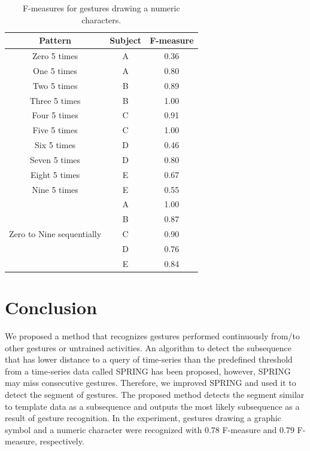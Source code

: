 \documentclass{sigchi-ext}
\begin{document}
        \begin{table}[!t]
        \centering
            \caption{F-measures for gestures drawing a numeric characters.}
            \label{tab:num-result}
                \begin{tabular}{c|cc}\hline\hline
                    Pattern & Subject & F-measure \\ \hline
                    Zero 5 times& A & 0.36  \\
                    One 5 times& A & 0.80  \\
                    Two 5 times& B & 0.89  \\
                    Three 5 times & B & 1.00  \\
                    Four 5 times& C & 0.91  \\
                    Five 5 times & C & 1.00  \\
                    Six 5 times& D & 0.46  \\
                    Seven 5 times & D & 0.80  \\
                    Eight 5 times& E & 0.67  \\
                    Nine 5 times& E & 0.55  \\ \hline
                    & A & 1.00  \\
                    & B & 0.87  \\
                    Zero to Nine sequentially & C  & 0.90  \\
                    & D & 0.76  \\
                    & E & 0.84  \\\hline
                \end{tabular}
        \end{table}

        \section{Conclusion}
        We proposed a method that recognizes gestures performed continuously from/to other gestures or untrained activities. An algorithm to detect the subsequence that has lower distance to a query of time-series than the predefined threshold from a time-series data called SPRING has been proposed, however, SPRING may miss consecutive gestures. Therefore, we improved SPRING and used it to detect the segment of gestures. The proposed method detects the segment similar to template data as a subsequence and outputs the most likely subsequence as a result of gesture recognition. In the experiment, gestures drawing a graphic symbol and a numeric character were recognized with 0.78 F-measure and 0.79 F-measure, respectively.
\end{document}
